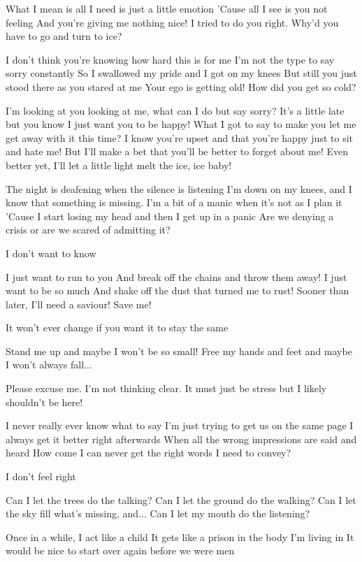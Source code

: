 What I mean is all I need is just a little emotion
'Cause all I see is you not feeling
And you're giving me nothing nice!
I tried to do you right. Why'd you have to go and turn to ice?

I don't think you're knowing how hard this is for me
I'm not the type to say sorry constantly
So I swallowed my pride and I got on my knees
But still you just stood there as you stared at me
Your ego is getting old! How did you get so cold?

I'm looking at you looking at me, what can I do but say sorry?
It's a little late but you know I just want you to be happy!
What I got to say to make you let me get away with it this time?
I know you're upset and that you're happy just to sit and hate me!
But I'll make a bet that you'll be better to forget about me!
Even better yet, I'll let a little light melt the ice, ice baby!


The night is deafening when the silence is listening
I'm down on my knees, and I know that something is missing.
I'm a bit of a manic when it's not as I plan it
'Cause I start losing my head and then I get up in a panic
Are we denying a crisis or are we scared of admitting it?

I don't want to know

I just want to run to you
And break off the chains and throw them away!
I just want to be so much
And shake off the dust that turned me to rust!
Sooner than later, I'll need a saviour!
Save me!

It won't ever change if you want it to stay the same

Stand me up and maybe I won't be so small!
Free my hands and feet and maybe I won't always fall...


Please excuse me. I'm not thinking clear.
It must just be stress but I likely shouldn't be here!

I never really ever know what to say
I'm just trying to get us on the same page
I always get it better right afterwards
When all the wrong impressions are said and heard
How come I can never get the right words I need to convey?

I don't feel right

Can I let the trees do the talking?
Can I let the ground do the walking?
Can I let the sky fill what's missing, and...
Can I let my mouth do the listening?


Once in a while, I act like a child
It gets like a prison in the body I'm living in
It would be nice to start over again before we were men

